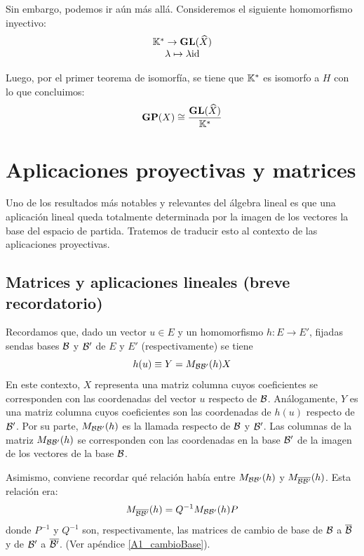 Sin embargo, podemos ir aún más allá. Consideremos el siguiente homomorfismo inyectivo:
\[\begin{array}{c}
\mathbb{K}^*\to\mathbf{GL}(\widehat{X})\\
\lambda\mapsto\lambda\mathrm{id}
\end{array}\]

Luego, por el primer teorema de isomorfía, se tiene que $\mathbb{K}^*$ es isomorfo a $H$ con lo que concluimos:
\begin{equation}\mathbf{GP}(X)\cong\frac{\mathbf{GL}(\widehat{X})}{\mathbb{K}^*}\end{equation}
\section{Aplicaciones proyectivas y matrices}
\label{apro_matrices}
Uno de los resultados más notables y relevantes del álgebra lineal es que una aplicación lineal queda totalmente determinada por la imagen de los vectores la base del espacio de partida. Tratemos de traducir esto al contexto de las aplicaciones proyectivas.
\subsection{Matrices y aplicaciones lineales (breve recordatorio)} 
Recordamos que, dado un vector $u\in E$ y un homomorfismo $h:E\to E'$, fijadas sendas bases $\mathcal{B}$ y $\mathcal{B}'$ de $E$ y $E'$ (respectivamente) se tiene
\begin{equation}
	\label{apro_eq_formulaLineales}
	h(u)\equiv Y=M_{\mathcal{B}\mathcal{B}'}(h)X
\end{equation}
En este contexto, $X$ representa una matriz columna cuyos coeficientes se corresponden con las coordenadas del vector $u$ respecto de $\mathcal{B}$. Análogamente, $Y$ es una matriz columna cuyos coeficientes son las coordenadas de $h(u)$ respecto de $\mathcal{B}'$. Por su parte, $M_{\mathcal{B}\mathcal{B}'}(h)$ es la llamada  respecto de $\mathcal{B}$ y $\mathcal{B}'$. Las columnas de la matriz $M_{\mathcal{B}\mathcal{B}'}(h)$ se corresponden con las coordenadas en la base $\mathcal{B}'$ de la imagen de los vectores de la base $\mathcal{B}$. 

Asimismo, conviene recordar qué relación había entre $M_{\mathcal{B}\mathcal{B}'}(h)$ y $M_{\overline{\mathcal{B}}\overline{\mathcal{B}'}}(h)$. Esta relación era:
\begin{equation}
\label{C4_eq_formulaLineales2}
	M_{\overline{\mathcal{B}}\overline{\mathcal{B}'}}(h)=Q^{-1}M_{\mathcal{B}\mathcal{B}'}(h)P
\end{equation}
donde $P^{-1}$ y $Q^{-1}$ son, respectivamente, las matrices de cambio de base de $\mathcal{B}$ a $\overline{\mathcal{B}}$ y de $\mathcal{B}'$ a $\overline{\mathcal{B}'}$. (Ver apéndice \ref{A1_cambioBase}).
